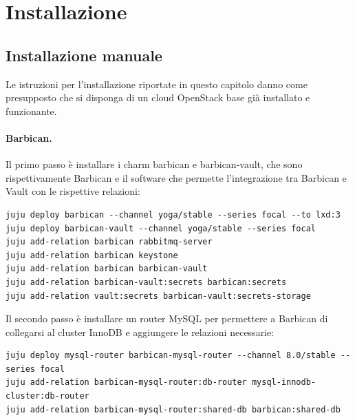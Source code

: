 \section{Installazione}

\subsection{Installazione manuale}

Le istruzioni per l'installazione riportate in questo capitolo danno come presupposto che si disponga di un cloud OpenStack base già installato e funzionante.

\paragraph{Barbican.} Il primo passo è installare i charm barbican e barbican-vault, che sono rispettivamente Barbican e il software che permette l'integrazione tra Barbican e Vault con le rispettive relazioni:
\begin{lstlisting}[language=mybash]
juju deploy barbican --channel yoga/stable --series focal --to lxd:3
juju deploy barbican-vault --channel yoga/stable --series focal
juju add-relation barbican rabbitmq-server
juju add-relation barbican keystone
juju add-relation barbican barbican-vault
juju add-relation barbican-vault:secrets barbican:secrets
juju add-relation vault:secrets barbican-vault:secrets-storage
\end{lstlisting}
Il secondo passo è installare un router MySQL per permettere a Barbican di collegarsi al cluster InnoDB e aggiungere le relazioni necessarie:
\begin{lstlisting}[language=mybash]
juju deploy mysql-router barbican-mysql-router --channel 8.0/stable --series focal
juju add-relation barbican-mysql-router:db-router mysql-innodb-cluster:db-router
juju add-relation barbican-mysql-router:shared-db barbican:shared-db
\end{lstlisting}

